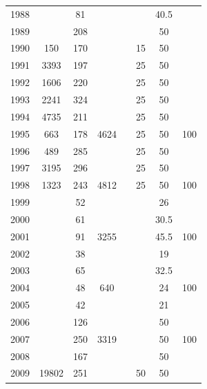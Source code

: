 \documentclass[]{article}
\begin{document}
\begin{table}[ht]
\begin{tabular}{lccccccc}
  1988 &              &  81        &          & &              & 40.5       & \\
  1989 &              & 208        &          & &              & 50         & \\
  1990 &  150         & 170        &          & & 15           & 50         & \\
  1991 &  3393        & 197        &          & & 25           & 50         & \\
  1992 &  1606        & 220        &          & & 25           & 50         & \\
  1993 &  2241        & 324        &          & & 25           & 50         & \\
  1994 &  4735        & 211        &          & & 25           & 50         & \\
  1995 &  663         & 178        &  4624    & & 25           & 50         & 100 \\
  1996 &  489         & 285        &          & & 25           & 50         & \\
  1997 &  3195        & 296        &          & & 25           & 50         & \\
  1998 &  1323        & 243        &  4812    & & 25           & 50         & 100 \\
  1999 &              &  52        &          & &              & 26         & \\
  2000 &              &  61        &          & &              & 30.5       & \\
  2001 &              &  91        &  3255    & &              & 45.5       & 100 \\
  2002 &              &  38        &          & &              & 19         & \\
  2003 &              &  65        &          & &              & 32.5       & \\
  2004 &              &  48        &  640     & &              & 24         & 100 \\
  2005 &              &  42        &          & &              & 21         & \\
  2006 &              & 126        &          & &              & 50         & \\
  2007 &              & 250        &  3319    & &              & 50         & 100 \\
  2008 &              & 167        &          & &              & 50         & \\
  2009 &  19802       & 251        &          & & 50           & 50         & \\

\end{tabular}
\end{table}
\end{document}
